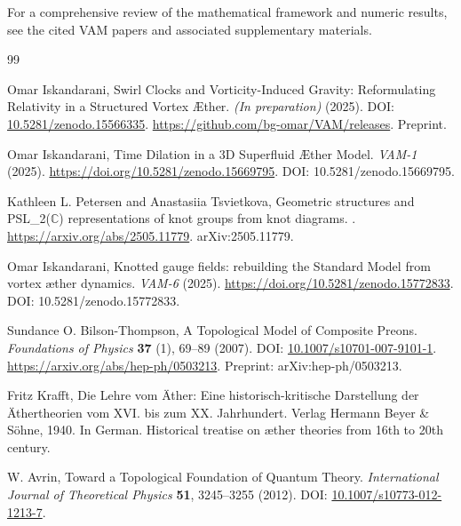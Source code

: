 \documentclass[11pt]{article}
\begin{document}
    \vspace{1em}
    For a comprehensive review of the mathematical framework and numeric results, see the cited VAM papers and associated supplementary materials.
\begin{thebibliography}{99}

Omar Iskandarani,
\newblock Swirl Clocks and Vorticity-Induced Gravity: Reformulating Relativity in a Structured Vortex Æther.
\textit{(In preparation)} (2025).
\newblock DOI: \href{https://doi.org/10.5281/zenodo.15566335}{10.5281/zenodo.15566335}.
\newblock \url{https://github.com/bg-omar/VAM/releases}.
\newblock Preprint.


Omar Iskandarani,
\newblock Time Dilation in a 3D Superfluid Æther Model.
\textit{VAM-1} (2025).
\newblock \url{https://doi.org/10.5281/zenodo.15669795}.
\newblock DOI: 10.5281/zenodo.15669795.


Kathleen L. Petersen and Anastasiia Tsvietkova,
\newblock Geometric structures and PSL\_2($\mathbb{C}$) representations of knot groups from knot diagrams.
.
\newblock \url{https://arxiv.org/abs/2505.11779}.
\newblock arXiv:2505.11779.


Omar Iskandarani,
\newblock Knotted gauge fields: rebuilding the Standard Model from vortex æther dynamics.
\textit{VAM-6} (2025).
\newblock \url{https://doi.org/10.5281/zenodo.15772833}.
\newblock DOI: 10.5281/zenodo.15772833.


Sundance O. Bilson-Thompson,
\newblock A Topological Model of Composite Preons.
\textit{Foundations of Physics} \textbf{37} (1), 69--89 (2007).
\newblock DOI: \href{https://doi.org/10.1007/s10701-007-9101-1}{10.1007/s10701-007-9101-1}.
\newblock \url{https://arxiv.org/abs/hep-ph/0503213}.
\newblock Preprint: arXiv:hep-ph/0503213.


Fritz Krafft,
\newblock Die Lehre vom Äther: Eine historisch-kritische Darstellung der Äthertheorien vom XVI. bis zum XX. Jahrhundert.
\newblock Verlag Hermann Beyer \& Söhne, 1940.
\newblock In German. Historical treatise on æther theories from 16th to 20th century.


W. Avrin,
\newblock Toward a Topological Foundation of Quantum Theory.
\textit{International Journal of Theoretical Physics} \textbf{51}, 3245--3255 (2012).
\newblock DOI: \href{https://doi.org/10.1007/s10773-012-1213-7}{10.1007/s10773-012-1213-7}.


\end{thebibliography}

    \vspace{1em}
\end{document}
